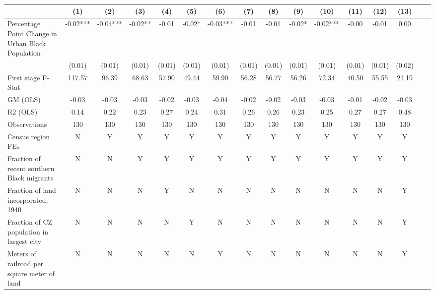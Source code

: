  \begin{tabular}{l*{15}{c}} \toprule
                    &\multicolumn{1}{c}{(1)}   &\multicolumn{1}{c}{(2)}   &\multicolumn{1}{c}{(3)}   &\multicolumn{1}{c}{(4)}   &\multicolumn{1}{c}{(5)}   &\multicolumn{1}{c}{(6)}   &\multicolumn{1}{c}{(7)}   &\multicolumn{1}{c}{(8)}   &\multicolumn{1}{c}{(9)}   &\multicolumn{1}{c}{(10)}   &\multicolumn{1}{c}{(11)}   &\multicolumn{1}{c}{(12)}   &\multicolumn{1}{c}{(13)}   \\
\midrule
Percentage Point Change in Urban Black Population& -0.02***& -0.04***& -0.02** & -0.01   & -0.02*  & -0.03***& -0.01   & -0.01   & -0.02*  & -0.02***& -0.00   & -0.01   &  0.00   \\
                    &(0.01)   &(0.01)   &(0.01)   &(0.01)   &(0.01)   &(0.01)   &(0.01)   &(0.01)   &(0.01)   &(0.01)   &(0.01)   &(0.01)   &(0.02)   \\
\midrule
First stage F-Stat  &117.57   & 96.39   & 68.63   & 57.90   & 49.44   & 59.90   & 56.28   & 56.77   & 56.26   & 72.34   & 40.50   & 55.55   & 21.19   \\
GM (OLS)            & -0.03   & -0.03   & -0.03   & -0.02   & -0.03   & -0.04   & -0.02   & -0.02   & -0.03   & -0.03   & -0.01   & -0.02   & -0.03   \\
R2 (OLS)            &  0.14   &  0.22   &  0.23   &  0.27   &  0.24   &  0.31   &  0.26   &  0.26   &  0.23   &  0.25   &  0.27   &  0.27   &  0.48   \\
Observations        &   130   &   130   &   130   &   130   &   130   &   130   &   130   &   130   &   130   &   130   &   130   &   130   &   130   \\
Census region FEs   &     N   &     Y   &     Y   &     Y   &     Y   &     Y   &     Y   &     Y   &     Y   &     Y   &     Y   &     Y   &     Y   \\
Fraction of recent southern Black migrants&     N   &     N   &     Y   &     Y   &     Y   &     Y   &     Y   &     Y   &     Y   &     Y   &     Y   &     Y   &     Y   \\
Fraction of land incorporated, 1940&     N   &     N   &     N   &     Y   &     N   &     N   &     N   &     N   &     N   &     N   &     N   &     N   &     Y   \\
Fraction of CZ population in largest city&     N   &     N   &     N   &     N   &     Y   &     N   &     N   &     N   &     N   &     N   &     N   &     N   &     Y   \\
Meters of railroad per square meter of land&     N   &     N   &     N   &     N   &     N   &     Y   &     N   &     N   &     N   &     N   &     N   &     N   &     Y   \\

\end{tabular}
